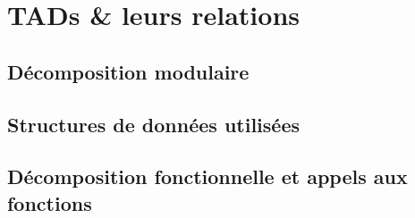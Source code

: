 \section{TADs \& leurs relations}
\subsection{Décomposition modulaire}

\bframes{
  
}

\bframes{
 
}

\bframes{
    
}


%

\subsection{Structures de données utilisées}

%
%
\subsection{Décomposition fonctionnelle et appels aux fonctions}
\bframes{
    
}
